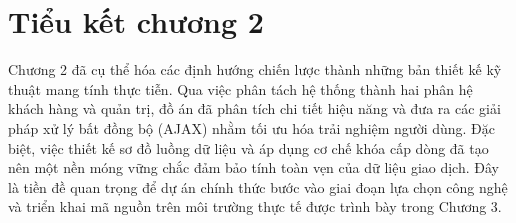\section*{Tiểu kết chương 2}
Chương 2 đã cụ thể hóa các định hướng chiến lược thành những bản thiết kế kỹ thuật mang tính thực tiễn. Qua việc phân tách hệ thống thành hai phân hệ khách hàng và quản trị, đồ án đã phân tích chi tiết hiệu năng và đưa ra các giải pháp xử lý bất đồng bộ (AJAX) nhằm tối ưu hóa trải nghiệm người dùng. Đặc biệt, việc thiết kế sơ đồ luồng dữ liệu và áp dụng cơ chế khóa cấp dòng đã tạo nên một nền móng vững chắc đảm bảo tính toàn vẹn của dữ liệu giao dịch. Đây là tiền đề quan trọng để dự án chính thức bước vào giai đoạn lựa chọn công nghệ và triển khai mã nguồn trên môi trường thực tế được trình bày trong Chương 3.
